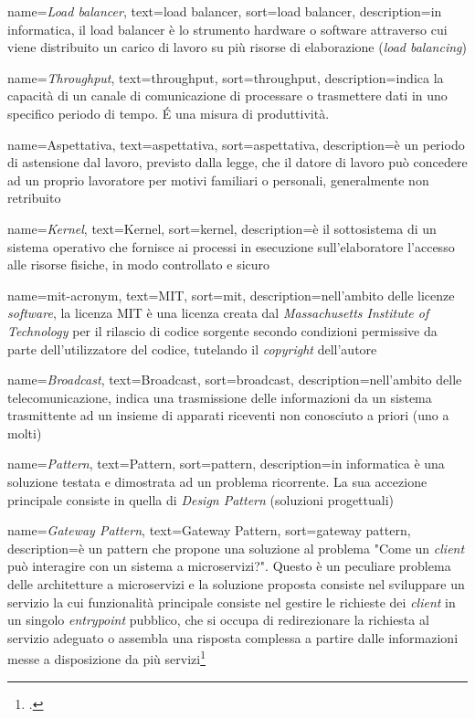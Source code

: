 {
  name=\emph{Load balancer},
  text=load balancer,
  sort=load balancer,
  description={in informatica, il load balancer è lo strumento hardware o software attraverso cui viene distribuito un carico di lavoro su più risorse di elaborazione (\textit{load balancing})}
}

{
  name=\emph{Throughput},
  text=throughput,
  sort=throughput,
  description={indica la capacità di un canale di comunicazione di processare o trasmettere dati in uno specifico periodo di tempo. É una misura di produttività.}
}

{
  name=Aspettativa,
  text=aspettativa,
  sort=aspettativa,
  description={è un periodo di astensione dal lavoro, previsto dalla legge, che il datore di lavoro può concedere ad un proprio lavoratore per motivi familiari o personali, generalmente non retribuito}
}

{
  name=\emph{Kernel},
  text={Kernel},
  sort=kernel,
  description={è il sottosistema di un sistema operativo che fornisce ai processi in esecuzione sull'elaboratore l'accesso alle risorse fisiche, in modo controllato e sicuro}
}

{
  name=\gls{mit-acronym},
  text=MIT,
  sort=mit,
  description={nell'ambito delle licenze \emph{software}, la licenza MIT è una licenza creata dal \emph{Massachusetts Institute of Technology} per il rilascio di codice sorgente secondo condizioni permissive da parte dell'utilizzatore del codice, tutelando il \emph{copyright} dell'autore}
}

{
  name=\emph{Broadcast},
  text={Broadcast},
  sort=broadcast,
  description={nell'ambito delle telecomunicazione, indica una trasmissione delle informazioni da un sistema trasmittente ad un insieme di apparati riceventi non conosciuto a priori (uno a molti)}
}

{
  name=\emph{Pattern},
  text={Pattern},
  sort=pattern,
  description={in informatica è una soluzione testata e dimostrata ad un problema ricorrente. La sua accezione principale consiste in quella di \emph{Design Pattern} (soluzioni progettuali)}
}

{
  name=\emph{Gateway Pattern},
  text={Gateway Pattern},
  sort=gateway pattern,
  description={è un \gls{pattern} che propone una soluzione al problema "Come un \emph{client} può interagire con un sistema a microservizi?". Questo è un peculiare problema delle architetture a microservizi e la soluzione proposta consiste nel sviluppare un servizio la cui funzionalità principale consiste nel gestire le richieste dei \emph{client} in un singolo \emph{entrypoint} pubblico, che si occupa di redirezionare la richiesta al servizio adeguato o assembla una risposta complessa a partire dalle informazioni messe a disposizione da più servizi\footcite{gateway-pattern}}
}

